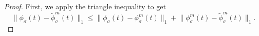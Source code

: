 \begin{proof}
    First, we apply the triangle inequality to get
    \begin{equation}
        \lVert \phi_{\sigma}(t) - \widetilde{\phi}_{\sigma}^m(t) \rVert _1
            \leq \lVert \phi_{\sigma}(t) - \phi_{\sigma}^m(t) \rVert _1 + \lVert \phi_{\sigma}^m(t) - \widetilde{\phi}_{\sigma}^m(t) \rVert _1.
    \end{equation}


\end{proof}
